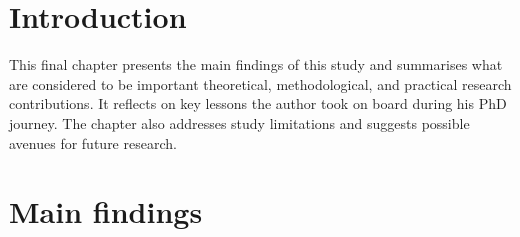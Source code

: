 \section{Introduction}

This final chapter presents the main findings of this study and summarises what are considered to be important theoretical, methodological, and practical research contributions. It reflects on key lessons the author took on board during his PhD journey. The chapter also addresses study limitations and suggests possible avenues for future research. 

\section{Main findings}




